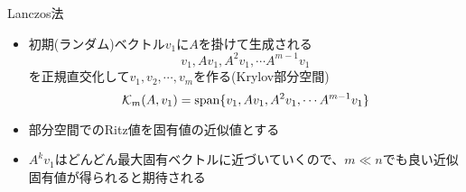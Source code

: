 \begin{frame}[t,fragile]{Lanczos法}
  \begin{itemize}
  \item 初期(ランダム)ベクトル$v_1$に$A$を掛けて生成される
    \[
    v_1, Av_1, A^2v_1, \cdots A^{m-1}v_1
    \]
    を正規直交化して$v_1,v_2,\cdots,v_m$を作る(Krylov部分空間)
    \[
      {\cal K}_m(A,v_1) = \text{span} \{ v_1, Av_1, A^2v_1, \cdots A^{m-1}v_1 \}
      \]
  \item 部分空間でのRitz値を固有値の近似値とする
  \item $A^kv_1$はどんどん最大固有ベクトルに近づいていくので、$m \ll n$でも良い近似固有値が得られると期待される
  \end{itemize}
\end{frame}
